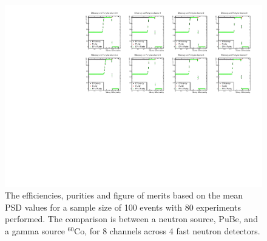 \begin{figure}[htbp]
\begin{center}
\includegraphics[width=160mm]{Chapter8/figures/eff_pur_allChannels_pube_co60_mean100Events_80Experiments.pdf}
\caption{The efficiencies, purities and figure of merits based on the mean PSD values for a sample size of 100 events with 80 experiments performed. The comparison is between a neutron source, PuBe, and a gamma source $^{60}$Co, for 8 channels across 4 fast neutron detectors.}
\label{fig:modesEffAndPurMean100EventsAllChannels}
\end{center}
\end{figure}

